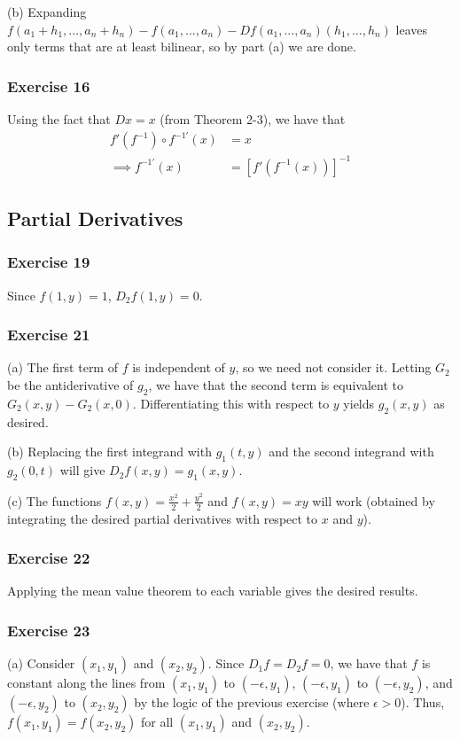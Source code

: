 (b) Expanding $f(a_1 + h_1, ..., a_n + h_n) - f(a_1, ..., a_n) - Df(a_1, ..., a_n)(h_1, ..., h_n)$
leaves only terms that are at least bilinear, so by part (a) we are done.

\subsubsection{Exercise 16}
Using the fact that $Dx = x$ (from Theorem 2-3), we have that
\begin{align*}
        f'(f^{-1}) \circ f^{-1\prime} (x) &= x \\
        \implies f^{-1\prime} (x) &= [f'(f^{-1} (x))]^{-1} 
\end{align*}

\subsection{Partial Derivatives}

\subsubsection{Exercise 19}
Since $f(1, y) = 1$, $D_2 f(1, y) = 0$.

\subsubsection{Exercise 21}
(a) The first term of $f$ is independent of $y$, so we need not consider it. Letting $G_2$ be the antiderivative of
$g_2$, we have that the second term is equivalent to $G_2(x, y) - G_2(x, 0)$. Differentiating this with respect to $y$
yields $g_2(x, y)$ as desired.

(b) Replacing the first integrand with $g_1(t, y)$ and the second integrand with $g_2(0, t)$ will give
$D_2 f(x, y) = g_1(x, y)$.

(c) The functions $f(x, y) = \frac{x^2}{2} + \frac{y^2}{2}$ and $f(x, y) = xy$ will work (obtained by integrating the
desired partial derivatives with respect to $x$ and $y$).

\subsubsection{Exercise 22}
Applying the mean value theorem to each variable gives the desired results.

\subsubsection{Exercise 23}
(a) Consider $(x_1, y_1)$ and $(x_2, y_2)$. Since $D_1 f = D_2 f = 0$, we have that $f$ is constant along the lines from
$(x_1, y_1)$ to $(-\epsilon, y_1)$, $(-\epsilon, y_1)$ to $(-\epsilon, y_2)$, and $(-\epsilon, y_2)$ to $(x_2, y_2)$ by
the logic of the previous exercise (where $\epsilon > 0$). Thus, $f(x_1, y_1) = f(x_2, y_2)$ for all $(x_1, y_1)$ and
$(x_2, y_2)$.

